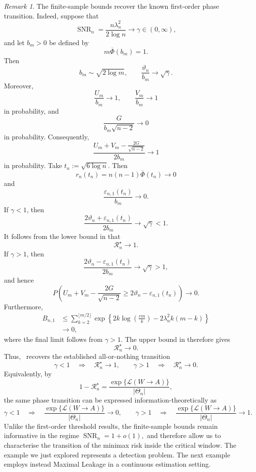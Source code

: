 \documentclass[11pt]{article}
\theoremstyle{definition}
\theoremstyle{remark}
\newtheorem{remark}[theorem]{Remark}
\newcommand{\1}{\boldsymbol{1}}
\newcommand{\ml}[2]{\mathcal{L}(#1\!\to\!#2)}
\begin{document}
\begin{remark}
The finite-sample bounds recover the known first-order phase transition.
Indeed, suppose that
\[
\operatorname{SNR}_n
=
\frac{n\lambda_n^2}{2\log n}
\longrightarrow
\gamma\in(0,\infty),
\]
and let $b_m>0$ be defined by
\[
m\overline\Phi(b_m)=1.
\]
Then
\[
b_m\sim\sqrt{2\log m},
\qquad
\frac{\vartheta_n}{b_m}
\longrightarrow
\sqrt{\gamma}.
\]
Moreover,
\[
\frac{U_m}{b_m}
\longrightarrow1,
\qquad
\frac{V_m}{b_m}
\longrightarrow1
\]
in probability, and
\[
\frac{G}{b_m\sqrt{n-2}}
\longrightarrow0
\]
in probability. Consequently,
\begin{equation}
\frac{
U_m+V_m-\frac{2G}{\sqrt{n-2}}
}{
2b_m
}
\longrightarrow1
\end{equation}
in probability. Take
\(
t_n:=\sqrt{6\log n}.
\)
Then
\[
r_n(t_n)
=
n(n-1)\overline\Phi(t_n)
\longrightarrow0
\]
and
\[
\frac{\varepsilon_{n,1}(t_n)}{b_m}
\longrightarrow0.
\]
If $\gamma<1$, then
\[
\frac{
2\vartheta_n+\varepsilon_{n,1}(t_n)
}{
2b_m
}
\longrightarrow
\sqrt{\gamma}<1.
\]
It follows from the lower bound in
 that
\[
\mathcal R_n^\star\longrightarrow1.
\]
If $\gamma>1$, then
\[
\frac{
2\vartheta_n-\varepsilon_{n,1}(t_n)
}{
2b_m
}
\longrightarrow
\sqrt{\gamma}>1,
\]
and hence
\[
P\left(
U_m+V_m-\frac{2G}{\sqrt{n-2}}
\geq
2\vartheta_n-\varepsilon_{n,1}(t_n)
\right)
\longrightarrow0.
\]
Furthermore,
\begin{align}
B_{n,1}
&\leq
\sum_{k=2}^{\lfloor m/2\rfloor}
\exp\left\{
2k\log\left(\frac{em}{k}\right)
-
2\lambda_n^2k(m-k)
\right\}\\
&\longrightarrow0,
\end{align}
where the final limit follows from $\gamma>1$. The upper bound in
 therefore gives
\[
\mathcal R_n^\star\longrightarrow0.
\]
Thus,~ recovers the established
all-or-nothing transition
\[
\gamma<1
\quad\Longrightarrow\quad
\mathcal R_n^\star\longrightarrow1,
\qquad
\gamma>1
\quad\Longrightarrow\quad
\mathcal R_n^\star\longrightarrow0.
\]
Equivalently, by
\[
1-\mathcal R_n^\star
=
\frac{\exp\{\ml{W}{A}\}}{|\Theta_n|},
\]
the same phase transition can be expressed information-theoretically as
\[
\gamma<1
\quad\Longrightarrow\quad
\frac{\exp\{\ml{W}{A}\}}{|\Theta_n|}
\longrightarrow0,
\qquad
\gamma>1
\quad\Longrightarrow\quad
\frac{\exp\{\ml{W}{A}\}}{|\Theta_n|}
\longrightarrow1.
\]
Unlike the first-order threshold results, the finite-sample bounds
remain informative in the regime
\(
\operatorname{SNR}_n=1+o(1),
\)
and therefore allow us to characterise the transition of the minimax
risk inside the critical window.
The example we just explored represents a detection problem. 
The next example employs instead Maximal Leakage in a continuous estimation setting.
\end{remark}\fi 
\end{document}
